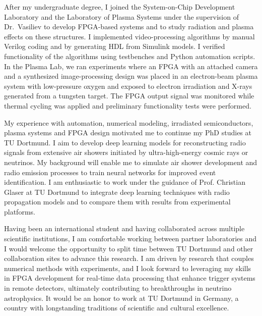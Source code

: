\documentclass[a4paper,12pt]{article}
\begin{document}
\vspace{10pt}
After my undergraduate degree, I joined the System-on-Chip Development Laboratory and the Laboratory of Plasma Systems under the supervision of Dr.\ Vasiliev to develop FPGA-based systems and to study radiation and plasma effects on these structures. I implemented video-processing algorithms by manual Verilog coding and by generating HDL from Simulink models. I verified functionality of the algorithms using testbenches and Python automation scripts. In the Plasma Lab, we ran experiments where an FPGA with an attached camera and a synthesized image-processing design was placed in an electron-beam plasma system with low-pressure oxygen and exposed to electron irradiation and X-rays generated from a tungsten target. The FPGA output signal was monitored while thermal cycling was applied and preliminary functionality tests were performed. 

\vspace{10pt}
My experience with automation, numerical modeling, irradiated semiconductors, plasma systems and FPGA design motivated me to continue my PhD studies at TU Dortmund. I aim to develop deep learning models for reconstructing radio signals from extensive air showers initiated by ultra-high-energy cosmic rays or neutrinos. My background will enable me to simulate air shower development and radio emission processes to train neural networks for improved event identification. I am enthusiastic to work under the guidance of Prof. Christian Glaser at TU Dortmund to integrate deep learning techniques with radio propagation models and to compare them with results from experimental platforms. 

\vspace{10pt}
Having been an international student and having collaborated across multiple scientific institutions, I am comfortable working between partner laboratories and I would welcome the opportunity to split time between TU Dortmund and other collaboration sites to advance this research. I am driven by research that couples numerical methods with experiments, and I look forward to leveraging my skills in FPGA development for real-time data processing that enhance trigger systems in remote detectors, ultimately contributing to breakthroughs in neutrino astrophysics. It would be an honor to work at TU Dortmund in Germany, a country with longstanding traditions of scientific and cultural excellence.
\end{document}
